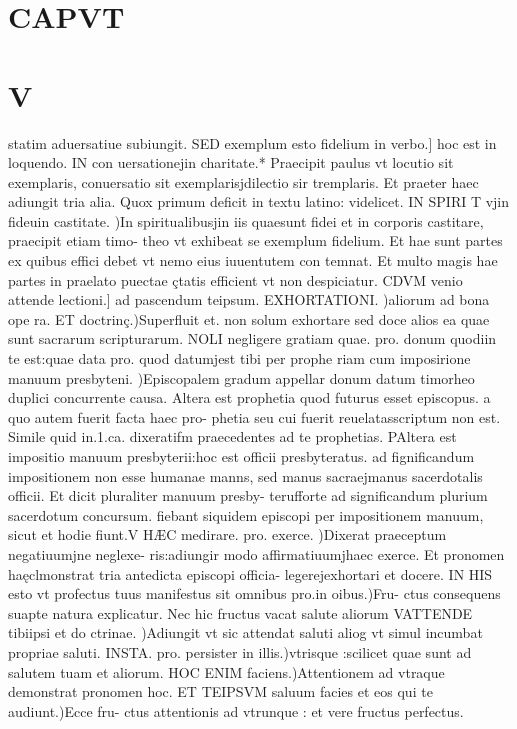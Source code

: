 \documentclass{article}
\begin{document}
\begin{pages}
\section*{CAPVT }
\section*{V }
\marginpar{[ p.144 ]}\pstart statim aduersatiue subiungit. SED exemplum esto fidelium in verbo.] hoc est in loquendo. IN con uersationejin charitate.* Praecipit paulus vt locutio sit exemplaris, conuersatio sit exemplarisjdilectio sir tremplaris. Et praeter haec adiungit tria alia. Quox primum deficit in textu latino: videlicet. IN SPIRI T vjin fideuin castitate. )In spiritualibusjin iis quaesunt fidei et in corporis castitare, praecipit etiam timo- theo vt exhibeat se exemplum fidelium. Et hae sunt partes ex quibus effici debet vt nemo eius iuuentutem con temnat. Et multo magis hae partes in praelato puectae çtatis efficient vt non despiciatur.  \pend\pstart CDVM venio attende lectioni.] ad pascendum teipsum. EXHORTATIONI. )aliorum ad bona ope ra. ET doctrinç.)Superfluit et. non solum exhortare sed doce alios ea quae sunt sacrarum scripturarum. NOLI negligere gratiam quae. pro. donum quodiin te est:quae data pro. quod datumjest tibi per prophe riam cum imposirione manuum presbyteni. )Episcopalem gradum appellar donum datum timorheo duplici concurrente causa. Altera est prophetia quod futurus esset episcopus. a quo autem fuerit facta haec pro- phetia seu cui fuerit reuelatasscriptum non est. Simile quid in.1.ca. dixeratifm praecedentes ad te prophetias. PAltera est impositio manuum presbyterii:hoc est officii presbyteratus. ad fignificandum impositionem non esse humanae manns, sed manus sacraejmanus sacerdotalis officii. Et dicit pluraliter manuum presby- terufforte ad significandum plurium sacerdotum concursum. fiebant siquidem episcopi per impositionem manuum, sicut et hodie fiunt.V HÆC medirare. pro. exerce. )Dixerat praeceptum negatiuumjne neglexe- ris:adiungir modo affirmatiuumjhaec exerce. Et pronomen haęclmonstrat tria antedicta episcopi officia- legerejexhortari et docere. IN HIS esto vt profectus tuus manifestus sit omnibus pro.in oibus.)Fru- ctus consequens suapte natura explicatur. Nec hic fructus vacat salute aliorum VATTENDE tibiipsi et do ctrinae. )Adiungit vt sic attendat saluti aliog vt simul incumbat propriae saluti. INSTA. pro. persister in illis.)vtrisque :scilicet quae sunt ad salutem tuam et aliorum. HOC ENIM faciens.)Attentionem ad vtraque demonstrat pronomen hoc. ET TEIPSVM saluum facies et eos qui te audiunt.)Ecce fru- ctus attentionis ad vtrunque : et vere fructus perfectus.  \pend

\end{pages}
\end{document}
